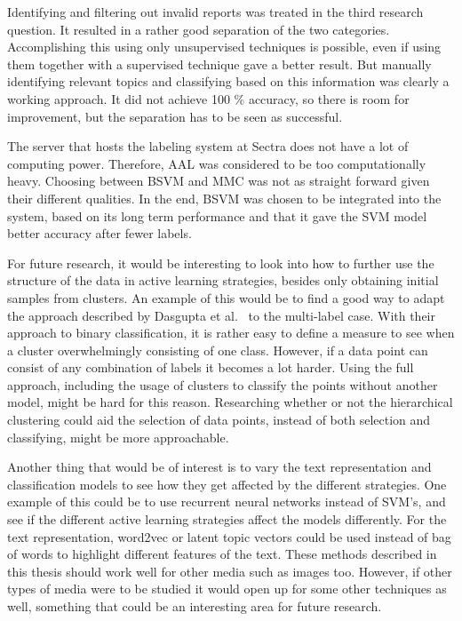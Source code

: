 Identifying and filtering out invalid reports was treated in the third research question.
It resulted in a rather good separation of the two categories.
Accomplishing this using only unsupervised techniques is possible, even if using them together with a supervised technique gave a better result.
But manually identifying relevant topics and classifying based on this information was clearly a working approach.
It did not achieve 100 \% accuracy, so there is room for improvement, but the separation has to be seen as successful.

The server that hosts the labeling system at Sectra does not have a lot of computing power.
Therefore, AAL was considered to be too computationally heavy.
Choosing between BSVM and MMC was not as straight forward given their different qualities.
In the end, BSVM was chosen to be integrated into the system, based on its long term performance and that it gave the SVM model better accuracy after fewer labels.

For future research, it would be interesting to look into how to further use the structure of the data in active learning strategies, besides only obtaining initial samples from clusters.
An example of this would be to find a good way to adapt the approach described by Dasgupta et al\@.~\cite{dasgupta2008hierarchical} to the multi-label case.
With their approach to binary classification, it is rather easy to define a measure to see when a cluster overwhelmingly consisting of one class.
However, if a data point can consist of any combination of labels it becomes a lot harder.
Using the full approach, including the usage of clusters to classify the points without another model, might be hard for this reason.
Researching whether or not the hierarchical clustering could aid the selection of data points, instead of both selection and classifying, might be more approachable.

Another thing that would be of interest is to vary the text representation and classification models to see how they get affected by the different strategies.
One example of this could be to use recurrent neural networks instead of SVM's, and see if the different active learning strategies affect the models differently.
For the text representation, word2vec or latent topic vectors could be used instead of bag of words to highlight different features of the text.
These methods described in this thesis should work well for other media such as images too. 
However, if other types of media were to be studied it would open up for some other techniques as well, something that could be an interesting area for future research.